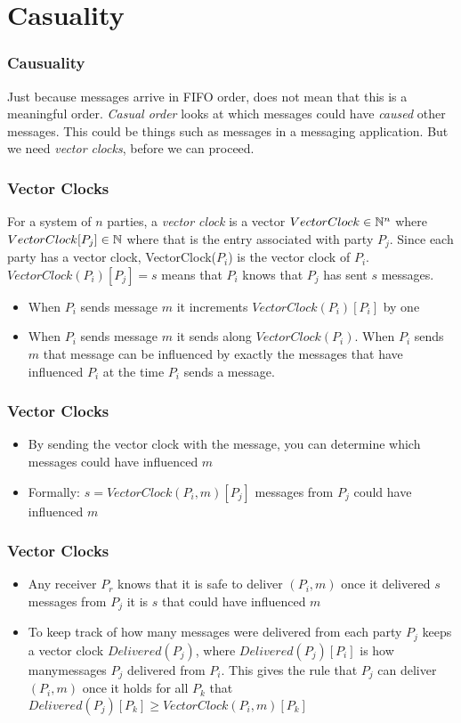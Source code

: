\section{Casuality}
    \begin{frame}
        \frametitle{Causuality}
            Just because messages arrive in FIFO order, does not mean that this is a meaningful order. \textit{Casual order} looks at which messages could have \textit{caused} other messages. This could be things such as messages in a messaging application. But we need \textit{vector clocks}, before we can proceed. 
    \end{frame}
    \begin{frame}
        \frametitle{Vector Clocks}
            For a system of $n$ parties, a \textit{vector clock} is a vector $VectorClock \in \mathbb{N}^n$ where $VectorClock[P_j] \in \mathbb{N}$ where that is the entry associated with party $P_j$. Since each party has a vector clock, VectorClock($P_i$) is the vector clock of $P_i$.
            $VectorClock(P_i)[P_j] = s$ means that $P_i$ knows that $P_j$ has sent $s$ messages. 
            \begin{itemize}
                \item When $P_i$ sends message $m$ it increments $VectorClock(P_i)[P_i]$ by one
                \item When $P_i$ sends message $m$ it sends along $VectorClock(P_i)$. When $P_i$ sends $m$ that message can be influenced by exactly the messages that have influenced $P_i$ at the time $P_i$ sends a message. 
            \end{itemize}
    \end{frame}
    \begin{frame}
        \frametitle{Vector Clocks}
            \begin{itemize}
                \item By sending the vector clock with the message, you can determine which messages could have influenced $m$
                \item Formally: $s = VectorClock(P_i, m)[P_j]$ messages from $P_j$ could have influenced $m$
            \end{itemize}
    \end{frame}

    \begin{frame}
        \frametitle{Vector Clocks}
            \begin{itemize}
                \item Any receiver $P_r$ knows that it is safe to deliver $(P_i, m)$ once it delivered $s$ messages from $P_j$ it is $s$ that could have influenced $m$
                \item To keep track of how many messages were delivered from each party $P_j$ keeps a vector clock $Delivered(P_j)$, where $Delivered(P_j)[P_i]$ is how manymessages $P_j$ delivered from $P_i$. This gives the rule that $P_j$ can deliver $(P_i, m)$ once it holds for all $P_k$ that $Delivered(P_j)[P_k] \geq VectorClock(P_i, m)[P_k]$
            \end{itemize}
    \end{frame}

